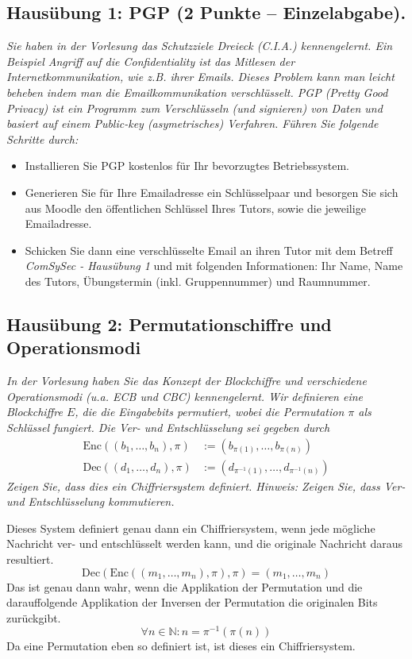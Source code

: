 \documentclass[
  ngerman,
  DIV=12
]{scrartcl}
\begin{document}
\subsection*{Hausübung 1: PGP (2 Punkte -- Einzelabgabe).}

\itshape Sie haben in der Vorlesung das Schutzziele Dreieck (C.I.A.) kennengelernt. Ein Beispiel Angriff auf die Confidentiality ist das Mitlesen der Internetkommunikation, wie z.B. ihrer Emails. Dieses Problem kann man leicht beheben indem man die Emailkommunikation verschlüsselt. PGP (Pretty Good Privacy) ist ein Programm zum Verschlüsseln (und signieren) von Daten und basiert auf einem Public-key (asymetrisches) Verfahren. Führen Sie folgende Schritte durch:
\begin{itemize}
\item Installieren Sie PGP kostenlos für Ihr bevorzugtes Betriebssystem.
\item Generieren Sie für Ihre Emailadresse ein Schlüsselpaar und besorgen Sie sich aus Moodle den öffentlichen Schlüssel Ihres Tutors, sowie die jeweilige Emailadresse.
\item Schicken Sie dann eine verschlüsselte Email an ihren Tutor mit dem Betreff \emph{ComSySec - Hausübung 1} und mit folgenden Informationen: Ihr Name, Name des Tutors, Übungstermin (inkl. Gruppennummer) und Raumnummer.  
\end{itemize}\upshape

\subsection*{Hausübung 2: Permutationschiffre und Operationsmodi}

\emph{In der Vorlesung haben Sie das Konzept der Blockchiffre und verschiedene Operationsmodi (u.a. ECB und CBC) kennengelernt. Wir definieren eine Blockchiffre $E$, die die Eingabebits permutiert, wobei die Permutation $\pi$ als Schlüssel fungiert. Die Ver- und Entschlüsselung sei gegeben durch}
\begin{align*}
\mathrm{Enc}((b_1,\dots,b_n),\pi) &:= (b_{\pi(1)},\dots,b_{\pi(n)})\\
\mathrm{Dec}((d_1,\dots,d_n),\pi) &:= (d_{\pi^{-1}(1)},\dots,d_{\pi^{-1}(n)})  
\end{align*}
\emph{Zeigen Sie, dass dies ein Chiffriersystem definiert. Hinweis: Zeigen Sie, dass Ver- und Entschlüsselung kommutieren.}

\medskip\noindent
Dieses System definiert genau dann ein Chiffriersystem, wenn jede mögliche Nachricht ver- und entschlüsselt werden kann, und die originale Nachricht daraus resultiert.
\begin{equation*}
\mathrm{Dec}(\mathrm{Enc}((m_1, \dots, m_n), \pi), \pi) = (m_1, \dots, m_n)
\end{equation*}
Das ist genau dann wahr, wenn die Applikation der Permutation und die darauffolgende Applikation der Inversen der Permutation die originalen Bits zurückgibt. 
\begin{equation*}
\forall n \in \mathbb{N} : n = \pi^{-1}(\pi(n))  
\end{equation*}
Da eine Permutation eben so definiert ist, ist dieses ein Chiffriersystem.
\end{document}
